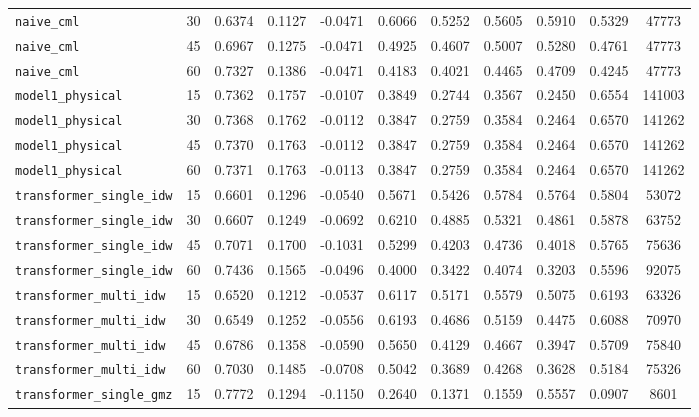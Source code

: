 \documentclass[12pt, a4paper]{article}
\begin{document}
{\begin{longtable}{p{4.0cm}cccccccccc}
\texttt{naive\_cml} & 30 & 0.6374 & 0.1127 & -0.0471 & 0.6066 & 0.5252 & 0.5605 & 0.5910 & 0.5329 & 47773 \\
\texttt{naive\_cml} & 45 & 0.6967 & 0.1275 & -0.0471 & 0.4925 & 0.4607 & 0.5007 & 0.5280 & 0.4761 & 47773 \\
\texttt{naive\_cml} & 60 & 0.7327 & 0.1386 & -0.0471 & 0.4183 & 0.4021 & 0.4465 & 0.4709 & 0.4245 & 47773 \\
\addlinespace[1pt]
\texttt{model1\_physical} & 15 & 0.7362 & 0.1757 & -0.0107 & 0.3849 & 0.2744 & 0.3567 & 0.2450 & 0.6554 & 141003 \\
\texttt{model1\_physical} & 30 & 0.7368 & 0.1762 & -0.0112 & 0.3847 & 0.2759 & 0.3584 & 0.2464 & 0.6570 & 141262 \\
\texttt{model1\_physical} & 45 & 0.7370 & 0.1763 & -0.0112 & 0.3847 & 0.2759 & 0.3584 & 0.2464 & 0.6570 & 141262 \\
\texttt{model1\_physical} & 60 & 0.7371 & 0.1763 & -0.0113 & 0.3847 & 0.2759 & 0.3584 & 0.2464 & 0.6570 & 141262 \\
\addlinespace[1pt]
\texttt{transformer\_single\_idw} & 15 & 0.6601 & 0.1296 & -0.0540 & 0.5671 & 0.5426 & 0.5784 & 0.5764 & 0.5804 & 53072 \\
\texttt{transformer\_single\_idw} & 30 & 0.6607 & 0.1249 & -0.0692 & 0.6210 & 0.4885 & 0.5321 & 0.4861 & 0.5878 & 63752 \\
\texttt{transformer\_single\_idw} & 45 & 0.7071 & 0.1700 & -0.1031 & 0.5299 & 0.4203 & 0.4736 & 0.4018 & 0.5765 & 75636 \\
\texttt{transformer\_single\_idw} & 60 & 0.7436 & 0.1565 & -0.0496 & 0.4000 & 0.3422 & 0.4074 & 0.3203 & 0.5596 & 92075 \\
\addlinespace[1pt]
\texttt{transformer\_multi\_idw} & 15 & 0.6520 & 0.1212 & -0.0537 & 0.6117 & 0.5171 & 0.5579 & 0.5075 & 0.6193 & 63326 \\
\texttt{transformer\_multi\_idw} & 30 & 0.6549 & 0.1252 & -0.0556 & 0.6193 & 0.4686 & 0.5159 & 0.4475 & 0.6088 & 70970 \\
\texttt{transformer\_multi\_idw} & 45 & 0.6786 & 0.1358 & -0.0590 & 0.5650 & 0.4129 & 0.4667 & 0.3947 & 0.5709 & 75840 \\
\texttt{transformer\_multi\_idw} & 60 & 0.7030 & 0.1485 & -0.0708 & 0.5042 & 0.3689 & 0.4268 & 0.3628 & 0.5184 & 75326 \\
\addlinespace[1pt]
\texttt{transformer\_single\_gmz} & 15 & 0.7772 & 0.1294 & -0.1150 & 0.2640 & 0.1371 & 0.1559 & 0.5557 & 0.0907 & 8601 \\

\end{longtable}}
\end{document}
